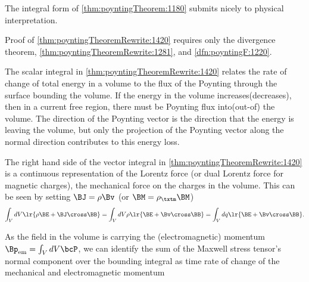 The integral form of \cref{thm:poyntingTheorem:1180} submits nicely to physical interpretation.

Proof of \cref{thm:poyntingTheoremRewrite:1420} requires only the divergence theorem, \cref{thm:poyntingTheoremRewrite:1281}, and
\cref{dfn:poyntingF:1220}.

The scalar integral in \cref{thm:poyntingTheoremRewrite:1420}
relates the rate of change of total energy in a volume to the flux of the Poynting through the surface bounding the volume.
If the energy in the volume increases(decreases), then in a current free region, there must be Poynting flux into(out-of) the volume.
The direction of the Poynting vector is the direction that the energy is leaving the volume, but only the projection of the Poynting vector along the normal direction contributes to this energy loss.

The right hand side of the vector integral in \cref{thm:poyntingTheoremRewrite:1420} is a continuous representation of the Lorentz force
(or dual Lorentz force for magnetic charges),
the mechanical force on the charges in the volume.  This can be seen by setting \( \BJ = \rho \Bv \) (or \( \BM = \rho_\txtm \BM \))
\begin{dmath}\label{eqn:poyntingTheoremRewrite:1420}
\int_V dV \lr{ \rho \BE + \BJ \cross \BB }
=
\int_V dV \rho \lr{ \BE + \Bv \cross \BB }
=
\int_V dq \lr{ \BE + \Bv \cross \BB }.
\end{dmath}

As the field in the volume is carrying the (electromagnetic) momentum \( \Bp_{\textrm{em}} = \int_V dV \bcP \), we can identify the sum of the Maxwell stress tensor's normal component over the bounding integral as time rate of change of the mechanical and electromagnetic momentum

